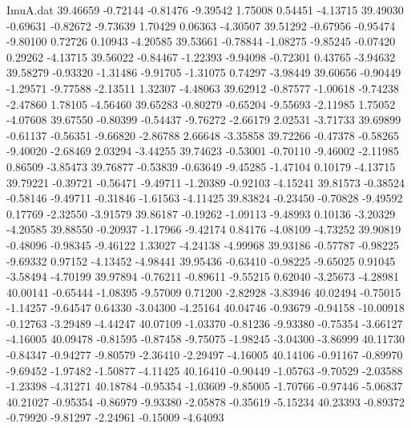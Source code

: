 \begin{filecontents}{ImuA.dat}
  39.46659   -0.72144   -0.81476   -9.39542    1.75008    0.54451   -4.13715
  39.49030   -0.69631   -0.82672   -9.73639    1.70429    0.06363   -4.30507
  39.51292   -0.67956   -0.95474   -9.80100    0.72726    0.10943   -4.20585
  39.53661   -0.78844   -1.08275   -9.85245   -0.07420    0.29262   -4.13715
  39.56022   -0.84467   -1.22393   -9.94098   -0.72301    0.43765   -3.94632
  39.58279   -0.93320   -1.31486   -9.91705   -1.31075    0.74297   -3.98449
  39.60656   -0.90449   -1.29571   -9.77588   -2.13511    1.32307   -4.48063
  39.62912   -0.87577   -1.00618   -9.74238   -2.47860    1.78105   -4.56460
  39.65283   -0.80279   -0.65204   -9.55693   -2.11985    1.75052   -4.07608
  39.67550   -0.80399   -0.54437   -9.76272   -2.66179    2.02531   -3.71733
  39.69899   -0.61137   -0.56351   -9.66820   -2.86788    2.66648   -3.35858
  39.72266   -0.47378   -0.58265   -9.40020   -2.68469    2.03294   -3.44255
  39.74623   -0.53001   -0.70110   -9.46002   -2.11985    0.86509   -3.85473
  39.76877   -0.53839   -0.63649   -9.45285   -1.47104    0.10179   -4.13715
  39.79221   -0.39721   -0.56471   -9.49711   -1.20389   -0.92103   -4.15241
  39.81573   -0.38524   -0.58146   -9.49711   -0.31846   -1.61563   -4.11425
  39.83824   -0.23450   -0.70828   -9.49592    0.17769   -2.32550   -3.91579
  39.86187   -0.19262   -1.09113   -9.48993    0.10136   -3.20329   -4.20585
  39.88550   -0.20937   -1.17966   -9.42174    0.84176   -4.08109   -4.73252
  39.90819   -0.48096   -0.98345   -9.46122    1.33027   -4.24138   -4.99968
  39.93186   -0.57787   -0.98225   -9.69332    0.97152   -4.13452   -4.98441
  39.95436   -0.63410   -0.98225   -9.65025    0.91045   -3.58494   -4.70199
  39.97894   -0.76211   -0.89611   -9.55215    0.62040   -3.25673   -4.28981
  40.00141   -0.65444   -1.08395   -9.57009    0.71200   -2.82928   -3.83946
  40.02494   -0.75015   -1.14257   -9.64547    0.64330   -3.04300   -4.25164
  40.04746   -0.93679   -0.94158  -10.00918   -0.12763   -3.29489   -4.44247
  40.07109   -1.03370   -0.81236   -9.93380   -0.75354   -3.66127   -4.16005
  40.09478   -0.81595   -0.87458   -9.75075   -1.98245   -3.04300   -3.86999
  40.11730   -0.84347   -0.94277   -9.80579   -2.36410   -2.29497   -4.16005
  40.14106   -0.91167   -0.89970   -9.69452   -1.97482   -1.50877   -4.11425
  40.16410   -0.90449   -1.05763   -9.70529   -2.03588   -1.23398   -4.31271
  40.18784   -0.95354   -1.03609   -9.85005   -1.70766   -0.97446   -5.06837
  40.21027   -0.95354   -0.86979   -9.93380   -2.05878   -0.35619   -5.15234
  40.23393   -0.89372   -0.79920   -9.81297   -2.24961   -0.15009   -4.64093

\end{filecontents}
